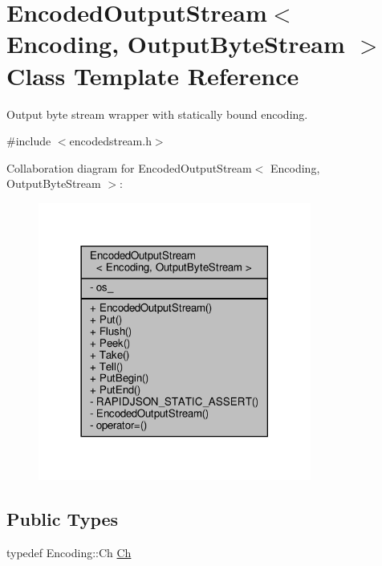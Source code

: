 \hypertarget{classEncodedOutputStream}{}\section{Encoded\+Output\+Stream$<$ Encoding, Output\+Byte\+Stream $>$ Class Template Reference}
\label{classEncodedOutputStream}


Output byte stream wrapper with statically bound encoding.  




{\ttfamily \#include $<$encodedstream.\+h$>$}



Collaboration diagram for Encoded\+Output\+Stream$<$ Encoding, Output\+Byte\+Stream $>$\+:
\nopagebreak
\begin{figure}[H]
\begin{center}
\leavevmode
\includegraphics[width=254pt]{classEncodedOutputStream__coll__graph}
\end{center}
\end{figure}
\subsection*{Public Types}
\begin{DoxyCompactItemize}
\item 
typedef Encoding\+::\+Ch \hyperlink{classEncodedOutputStream_aa8f494d7ee2808307fbc9cd658c0f760}{Ch}
\end{DoxyCompactItemize}
